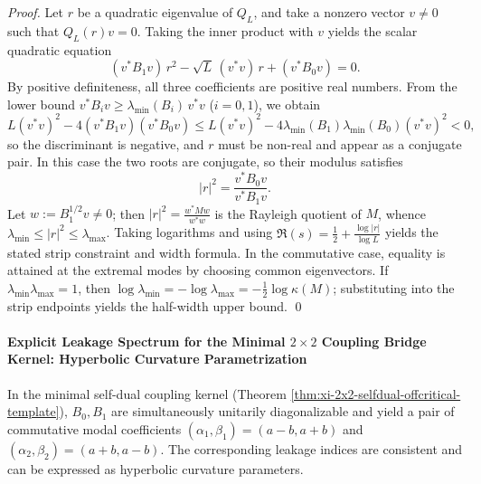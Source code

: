 \begin{proof}
Let \(r\) be a quadratic eigenvalue of \(Q_L\), and take a nonzero vector \(v\neq 0\) such that \(Q_L(r)v=0\).
Taking the inner product with \(v\) yields the scalar quadratic equation
\[
(v^\ast B_1v)\,r^2-\sqrt L\,(v^\ast v)\,r+(v^\ast B_0v)=0.
\]
By positive definiteness, all three coefficients are positive real numbers.
From the lower bound \(v^\ast B_i v\ge \lambda_{\min}(B_i)\,v^\ast v\) (\(i=0,1\)), we obtain
\[
L(v^\ast v)^2-4(v^\ast B_1v)(v^\ast B_0v)
\le
L(v^\ast v)^2-4\lambda_{\min}(B_1)\lambda_{\min}(B_0)(v^\ast v)^2<0,
\]
so the discriminant is negative, and \(r\) must be non-real and appear as a conjugate pair.
In this case the two roots are conjugate, so their modulus satisfies
\[
|r|^2=\frac{v^\ast B_0v}{v^\ast B_1v}.
\]
Let \(w:=B_1^{1/2}v\neq 0\); then
\(
|r|^2=\frac{w^\ast Mw}{w^\ast w}
\)
is the Rayleigh quotient of \(M\), whence
\(
\lambda_{\min}\le |r|^2\le \lambda_{\max}
\).
Taking logarithms and using \(\Re(s)=\tfrac12+\frac{\log|r|}{\log L}\) yields the stated strip constraint and width formula.
In the commutative case, equality is attained at the extremal modes by choosing common eigenvectors.
If \(\lambda_{\min}\lambda_{\max}=1\), then \(\log\lambda_{\min}=-\log\lambda_{\max}=-\frac12\log\kappa(M)\); substituting into the strip endpoints yields the half-width upper bound. \qed
\end{proof}

\paragraph{Explicit Leakage Spectrum for the Minimal \texorpdfstring{$2\times2$}{2x2} Coupling Bridge Kernel: Hyperbolic Curvature Parametrization}
In the minimal self-dual coupling kernel (Theorem \ref{thm:xi-2x2-selfdual-offcritical-template}), \(B_0,B_1\) are simultaneously unitarily diagonalizable and yield a pair of commutative modal coefficients
\(
(\alpha_1,\beta_1)=(a-b,a+b)
\)
and
\(
(\alpha_2,\beta_2)=(a+b,a-b)
\).
The corresponding leakage indices are consistent and can be expressed as hyperbolic curvature parameters.

